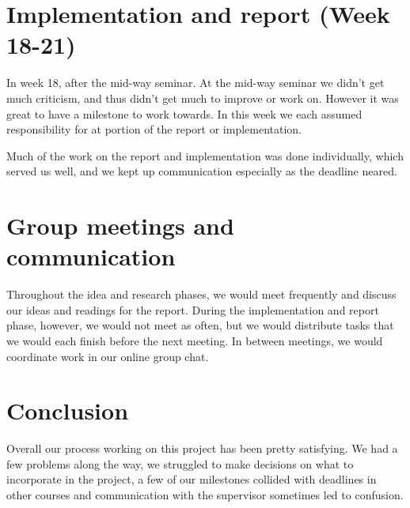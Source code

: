 \documentclass[12pt]{article}
\begin{document}
\section{Implementation and report (Week 18-21)}

In week 18, after the mid-way seminar. At the mid-way seminar we didn't get much criticism, and thus didn't get much to improve or work on. However it was great to have a milestone to work towards. In this week we each assumed responsibility for at portion of the report or implementation.

Much of the work on the report and implementation was done individually, which served us well, and we kept up communication especially as the deadline neared.  

\section{Group meetings and communication}
Throughout the idea and research phases, we would meet frequently and discuss our ideas and readings for the report. During the implementation and report phase, however, we would not meet as often, but we would distribute tasks that we would each finish before the next meeting. In between meetings, we would coordinate work in our online group chat.

\section{Conclusion}
Overall our process working on this project has been pretty satisfying. We had a few problems along the way, we struggled to make decisions on what to incorporate in the project, a few of our milestones collided with deadlines in other courses and communication with the supervisor sometimes led to confusion.
\end{document}
